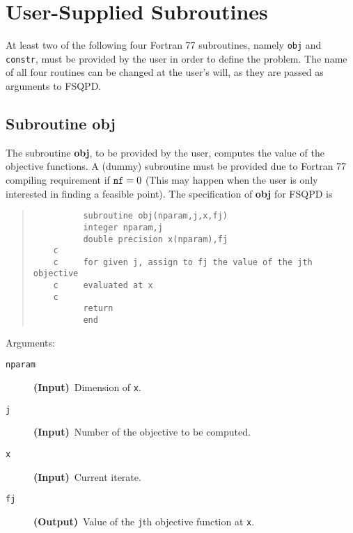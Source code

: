 \section{User-Supplied Subroutines}
At least two of the following four Fortran 77 subroutines, 
namely {\tt obj} and {\tt constr}, 
must be provided by the user in order to define the problem. 
The name of all four routines can be changed at the user's will, 
as they are passed as arguments to FSQPD.

\subsection{Subroutine obj}
\label{subobj}
The subroutine {\bf obj}, to be provided by the user, 
computes the value of the objective functions. 
A (dummy) subroutine must be provided due to Fortran 77 compiling
requirement if $\mbox{\tt nf}=0$ (This may happen when the user
is only interested in finding a feasible point).
The specification of {\bf obj} for FSQPD is
\begin{quote}
\begin{verbatim}
          subroutine obj(nparam,j,x,fj)
          integer nparam,j
          double precision x(nparam),fj
    c     
    c     for given j, assign to fj the value of the jth objective
    c     evaluated at x 
    c
          return
          end
\end{verbatim}
\end{quote}
\noindent Arguments:
\begin{description}
\item[\tt nparam] {\bf (Input)}~Dimension of {\tt x}.
\item[\tt j]      {\bf (Input)}~Number of the objective to be computed.
\item[\tt x]      {\bf (Input)}~Current iterate.
\item[\tt fj]     {\bf (Output)}~Value of the {\tt j}th objective function
                  at {\tt x}.
\end{description}

